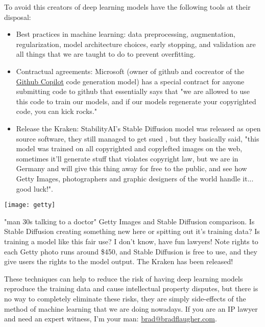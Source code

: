 To avoid this creators of deep learning models have the following tools at their disposal:


\begin{itemize}
\item Best practices in machine learning: data preprocessing, augmentation, regularization, model architecture choices, early stopping, and validation are all things that we are taught to do to prevent overfitting.
\item Contractual agreements: Microsoft (owner of github and cocreator of the \href{https://github.com/features/copilot}{Github Copilot} code generation model) has a special contract for anyone submitting code to github that essentially says that "we are allowed to use this code to train our models, and if our models regenerate your copyrighted code, you can kick rocks."
\item Release the Kraken: StabilityAI's Stable Diffusion model was released as open source software, they still managed to get sued \cite{getty}, but they basically said, "this model was trained on all copyrighted and copylefted images on the web, sometimes it'll generate stuff that violates copyright law, but we are in Germany and will give this thing away for free to the public, and see how Getty Images, photographers and graphic designers of the world handle it... good luck!". 
\end{itemize}

\begin{pdf}
\begin{marginfigure}[-5.5cm]
        \texttt{[image: getty]}
        \caption{"man 30s talking to a doctor" Getty Images and Stable Diffusion comparison. Is Stable Diffusion creating something new here or spitting out it's training data? Is training a model like this fair use? I don't know, have fun lawyers! Note rights to each Getty photo runs around \$450, and Stable Diffusion is free to use, and they give users the rights to the model output. The Kraken has been released!}
\end{marginfigure}
\end{pdf}

These techniques can help to reduce the risk of having deep learning models reproduce the training data and cause intellectual property disputes, but there is no way to completely eliminate these risks, they are simply side-effects of the method of machine learning that we are doing nowadays. If you are an IP lawyer and need an expert witness, I'm your man: \href{mailto:brad@bradflaugher.com}{brad@bradflaugher.com}.

